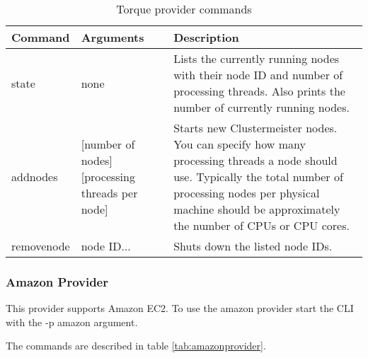 \begin{table}[h]
\centering
\begin{tabular}{|l| p{3cm} | p{6cm}|}
\hline
\textbf{Command} & \textbf{Arguments} & \textbf{Description} \\ \hline
state & none & Lists the currently running nodes with their node ID and number of processing threads. Also prints the number of currently running nodes. \\ \hline
addnodes & [number of nodes] [processing threads per node] & Starts new Clustermeister nodes. You can specify how many processing threads a node should use. Typically the total number of processing nodes per physical machine should be approximately the number of CPUs or CPU cores. \\ \hline
removenode & node ID... & Shuts down the listed node IDs. \\ \hline
\end{tabular}
\caption{Torque provider commands}
\label{tab:torqueprovider}
\end{table}

\subsubsection{Amazon Provider}

This provider supports Amazon EC2. To use the amazon provider start the CLI with the -p amazon argument.

The commands are described in table \ref{tab:amazonprovider}.

